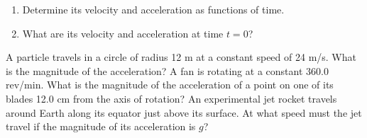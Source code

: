 \documentclass[12pt,addpoints]{exam}
\begin{document}
\begin{center}
\begin{questions}
			\begin{enumerate}[label=(\alph*)]
				\item Determine its velocity and acceleration as functions of time. \vspace{1in}
				\item What are its velocity and acceleration at time $t = 0$?\vspace{1in}
			\end{enumerate}
			\question A particle travels in a circle of radius 12 m at a constant speed of 24 m/s. What is the magnitude of the acceleration?\vspace{1in}
			\question A fan is rotating at a constant 360.0 rev/min. What is the magnitude of the acceleration of a point on one of its blades 12.0 cm from the axis of rotation?\vspace{1in}
			\question An experimental jet rocket travels around Earth along its equator just above its surface. At what speed must the jet travel if the magnitude of its acceleration is $g$?
		\end{questions}	
	\end{center}		
\end{document}
